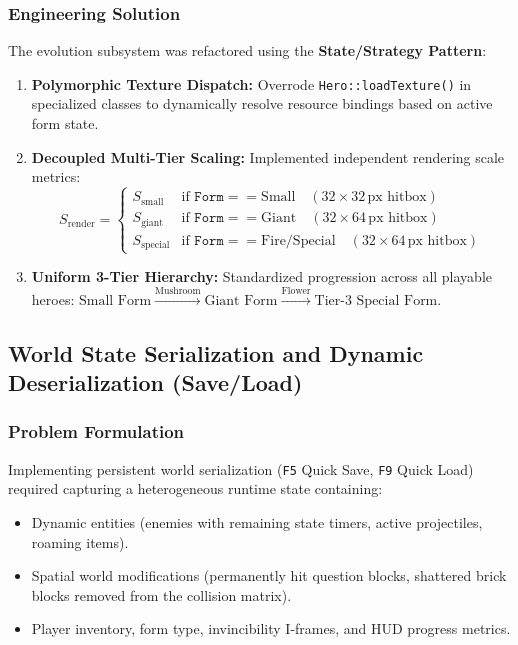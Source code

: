 \subsubsection{Engineering Solution}
The evolution subsystem was refactored using the \textbf{State/Strategy Pattern}:
\begin{enumerate}
    \item \textbf{Polymorphic Texture Dispatch:} Overrode \texttt{Hero::loadTexture()} in specialized classes to dynamically resolve resource bindings based on active form state.
    \item \textbf{Decoupled Multi-Tier Scaling:} Implemented independent rendering scale metrics:
    \begin{equation}
        S_{\text{render}} = 
        \begin{cases} 
            S_{\text{small}} & \text{if } \mathtt{Form} == \text{Small} \quad (32\times 32\,\text{px hitbox}) \\
            S_{\text{giant}} & \text{if } \mathtt{Form} == \text{Giant} \quad (32\times 64\,\text{px hitbox}) \\
            S_{\text{special}} & \text{if } \mathtt{Form} == \text{Fire/Special} \quad (32\times 64\,\text{px hitbox})
        \end{cases}
    \end{equation}
    \item \textbf{Uniform 3-Tier Hierarchy:} Standardized progression across all playable heroes: $\text{Small Form} \xrightarrow{\text{Mushroom}} \text{Giant Form} \xrightarrow{\text{Flower}} \text{Tier-3 Special Form}$.
\end{enumerate}

\subsection{World State Serialization and Dynamic Deserialization (Save/Load)}
\label{subsec:save_load_architecture}

\subsubsection{Problem Formulation}
Implementing persistent world serialization (\texttt{F5} Quick Save, \texttt{F9} Quick Load) required capturing a heterogeneous runtime state containing:
\begin{itemize}
    \item Dynamic entities (enemies with remaining state timers, active projectiles, roaming items).
    \item Spatial world modifications (permanently hit question blocks, shattered brick blocks removed from the collision matrix).
    \item Player inventory, form type, invincibility I-frames, and HUD progress metrics.
\end{itemize}


